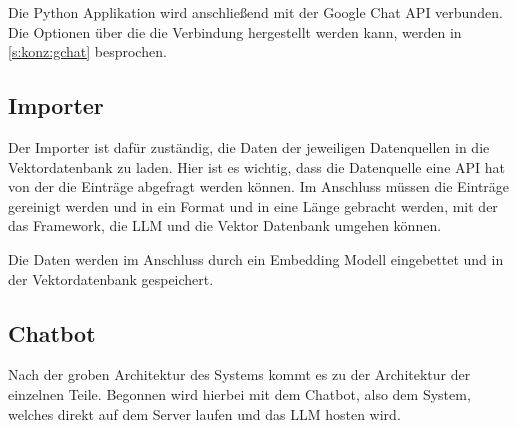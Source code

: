 Die Python Applikation wird anschließend mit der Google Chat API verbunden. Die Optionen 
über die die Verbindung hergestellt werden kann, werden in \ref*{s:konz:gchat} besprochen.\par

\subsection{Importer}
\label{s:konz:imp}
Der Importer ist dafür zuständig, die Daten der jeweiligen Datenquellen
in die Vektordatenbank zu laden. Hier ist es wichtig, dass die Datenquelle
eine API hat von der die Einträge abgefragt werden können. Im Anschluss 
müssen die Einträge gereinigt werden und in ein Format und in eine Länge
gebracht werden, mit der das Framework, die LLM und die Vektor Datenbank 
umgehen können.\par 
Die Daten werden im Anschluss durch ein Embedding Modell eingebettet und 
in der Vektordatenbank gespeichert.

\subsection{Chatbot}
\label{s:konz:bot}
Nach der groben Architektur des Systems kommt es zu der Architektur der einzelnen Teile. 
Begonnen wird hierbei mit dem Chatbot, also dem System, welches direkt auf dem Server
laufen und das LLM hosten wird.

